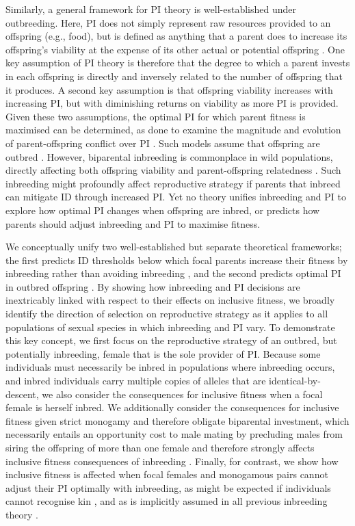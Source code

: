 \documentclass[10pt,letterpaper]{article}
\begin{document}
Similarly, a general framework for PI theory is well-established under outbreeding. Here, PI does not simply represent raw resources provided to an offspring (e.g., food), but is defined as anything that a parent does to increase its offspring's viability at the expense of its other actual or potential offspring \cite[][]{Trivers1972, Trivers1974}. One key assumption of PI theory is therefore that the degree to which a parent invests in each offspring is directly and inversely related to the number of offspring that it produces. A second key assumption is that offspring viability increases with increasing PI, but with diminishing returns on viability as more PI is provided. Given these two assumptions, the optimal PI for which parent fitness is maximised can be determined, as done to examine the magnitude and evolution of parent-offspring conflict over PI \cite[][]{Macnair1978, Parker1978, Parker1985, DeJong2005, Kuijper2012}. Such models assume that offspring are outbred \cite[or result from self-fertilisation,][]{DeJong2005}. However, biparental inbreeding is commonplace in wild populations, directly affecting both offspring viability and parent-offspring relatedness \cite[][]{Trivers1974, Lynch1998, OGrady2006, Charlesworth2009, Reid2016}. Such inbreeding might profoundly affect reproductive strategy if parents that inbreed can mitigate ID through increased PI. Yet no theory unifies inbreeding and PI to explore how optimal PI changes when offspring are inbred, or predicts how parents should adjust inbreeding and PI to maximise fitness. 

We conceptually unify two well-established but separate theoretical frameworks; the first predicts ID thresholds below which focal parents increase their fitness by inbreeding rather than avoiding inbreeding \cite[][]{Parker1979}, and the second predicts optimal PI in outbred offspring \cite[][]{Macnair1978}. By showing how inbreeding and PI decisions are inextricably linked with respect to their effects on inclusive fitness, we broadly identify the direction of selection on reproductive strategy as it applies to all populations of sexual species in which inbreeding and PI vary. To demonstrate this key concept, we first focus on the reproductive strategy of an outbred, but potentially inbreeding, female that is the sole provider of PI. Because some individuals must necessarily be inbred in populations where inbreeding occurs, and inbred individuals carry multiple copies of alleles that are identical-by-descent, we also consider the consequences for inclusive fitness when a focal female is herself inbred. We additionally consider the consequences for inclusive fitness given strict monogamy and therefore obligate biparental investment, which necessarily entails an opportunity cost to male mating by precluding males from siring the offspring of more than one female and therefore strongly affects inclusive fitness consequences of inbreeding \cite[][]{Waser1986}. Finally, for contrast, we show how inclusive fitness is affected when focal females and monogamous pairs cannot adjust their PI optimally with inbreeding, as might be expected if individuals cannot recognise kin \cite[][]{Penn2010}, and as is implicitly assumed in all previous inbreeding theory \cite[][]{Parker1979, Parker2006, Waser1986, Kokko2006, Duthie2015a}.
\end{document}
